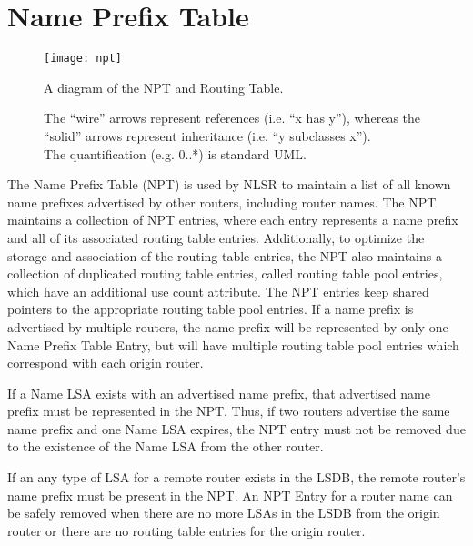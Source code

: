 \section{Name Prefix Table}
\label{sec:npt}

\begin{figure}[!h]
  \center
  \texttt{[image: npt]}
  \begin{caption}
    A diagram of the NPT and Routing Table.

    \begin{footnotesize}
      The ``wire'' arrows represent references (i.e. ``x has y''),
      whereas the ``solid'' arrows represent inheritance (i.e. ``y subclasses x''). \\
      The quantification (e.g. 0..*) is standard UML.
    \end{footnotesize}
  \end{caption}
  \label{fig:npt-class-diagram}
\end{figure}

The Name Prefix Table (NPT) is used by NLSR to maintain a list of all known name prefixes advertised by other routers, including router names.
The NPT maintains a collection of NPT entries, where each entry represents a name prefix and all of its associated routing table entries.
Additionally, to optimize the storage and association of the routing table entries, the NPT also maintains a collection of duplicated routing table entries, called routing table pool entries, which have an additional use count attribute.
The NPT entries keep shared pointers to the appropriate routing table pool entries.
If a name prefix is advertised by multiple routers, the name prefix will be represented by only one Name Prefix Table Entry, but will have multiple routing table pool entries  which correspond with each origin router.

If a Name LSA exists with an advertised name prefix, that advertised name prefix must be represented in the NPT.
Thus, if two routers advertise the same name prefix and one Name LSA expires, the NPT entry must not be removed due to the existence of the Name LSA from the other router.

If an any type of LSA for a remote router exists in the LSDB, the remote router's name prefix must be present in the NPT.
An NPT Entry for a router name can be safely removed when there are no more LSAs in the LSDB from the origin router or there are no routing table entries for the origin router.

